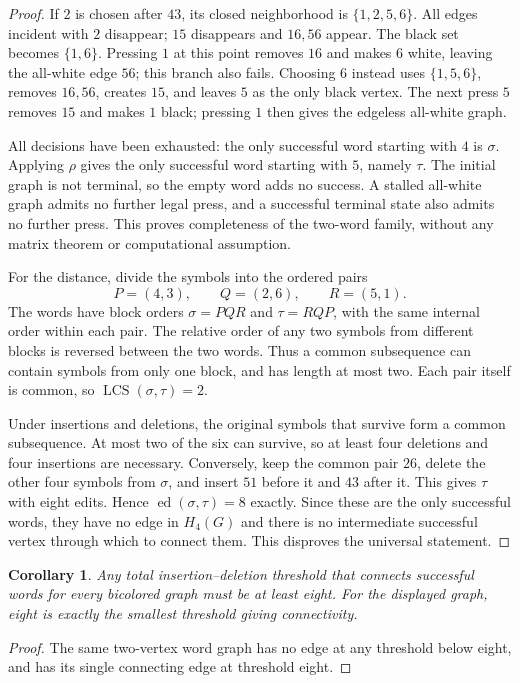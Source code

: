 \documentclass[11pt]{article}
\newtheorem{corollary}[theorem]{Corollary}
\newcommand{\ed}{\operatorname{ed}}
\newcommand{\LCS}{\operatorname{LCS}}
\begin{document}
\begin{proof}
If $2$ is chosen after $43$, its closed neighborhood is
$\{1,2,5,6\}$. All edges incident with $2$ disappear; $15$ disappears
and $16,56$ appear. The black set becomes $\{1,6\}$. Pressing $1$
at this point removes $16$ and makes $6$ white, leaving the all-white
edge $56$; this branch also fails. Choosing $6$ instead uses
$\{1,5,6\}$, removes $16,56$, creates $15$, and leaves $5$ as the
only black vertex. The next press $5$ removes $15$ and makes $1$
black; pressing $1$ then gives the edgeless all-white graph.

All decisions have been exhausted: the only successful word starting
with $4$ is $\sigma$. Applying $\rho$ gives the only successful word
starting with $5$, namely $\tau$. The initial graph is not terminal,
so the empty word adds no success. A stalled all-white graph admits
no further legal press, and a successful terminal state also admits
no further press. This proves completeness of the two-word family,
without any matrix theorem or computational assumption.

For the distance, divide the symbols into the ordered pairs
\[
                 P=(4,3),\qquad Q=(2,6),\qquad R=(5,1).
\]
The words have block orders $\sigma=PQR$ and $\tau=RQP$, with the
same internal order within each pair. The relative order of any two
symbols from different blocks is reversed between the two words.
Thus a common subsequence can contain symbols from only one block,
and has length at most two. Each pair itself is common, so
$\LCS(\sigma,\tau)=2$.

Under insertions and deletions, the original symbols that survive
form a common subsequence. At most two of the six can survive, so
at least four deletions and four insertions are necessary. Conversely,
keep the common pair $26$, delete the other four symbols from
$\sigma$, and insert $51$ before it and $43$ after it. This gives
$\tau$ with eight edits. Hence $\ed(\sigma,\tau)=8$ exactly.
Since these are the only successful words, they have no edge in
$H_4(G)$ and there is no intermediate successful vertex through which
to connect them. This disproves the universal statement.
\end{proof}

\begin{corollary}\label{lowerbound}
Any total insertion--deletion threshold that connects successful words
for every bicolored graph must be at least eight. For the displayed graph,
eight is exactly the smallest threshold giving connectivity.
\end{corollary}
\begin{proof}
The same two-vertex word graph has no edge at any threshold below eight,
and has its single connecting edge at threshold eight.
\end{proof}
\end{document}
